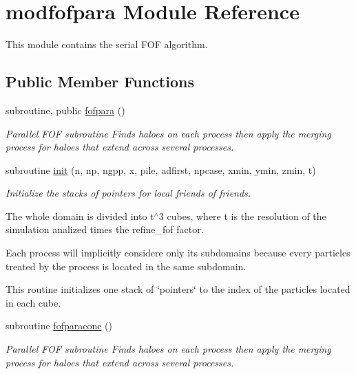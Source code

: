 \hypertarget{classmodfofpara}{\section{modfofpara Module Reference}
\label{classmodfofpara}
}


This module contains the serial F\-O\-F algorithm.  


\subsection*{Public Member Functions}
\begin{DoxyCompactItemize}
\item 
subroutine, public \hyperlink{classmodfofpara_a4ec0353cad472761978bbabf6846ac4f}{fofpara} ()
\begin{DoxyCompactList}\small\item\em Parallel F\-O\-F subroutine Finds haloes on each process then apply the merging process for haloes that extend across several processes. \end{DoxyCompactList}\item 
subroutine \hyperlink{classmodfofpara_a5294ecab752fb3cfbea3bec7cd28a29a}{init} (n, np, ngpp, x, pile, adfirst, npcase, xmin, ymin, zmin, t)
\begin{DoxyCompactList}\small\item\em Initialize the stacks of pointers for local friends of friends.\par
 The whole domain is divided into t$^\wedge$3 cubes, where t is the resolution of the simulation analized times the refine\-\_\-fof factor.\par
 Each process will implicitly considere only its subdomains because every particles treated by the process is located in the same subdomain.\par
 This routine initializes one stack of \char`\"{}pointers\char`\"{} to the index of the particles located in each cube. \end{DoxyCompactList}\item 
subroutine \hyperlink{classmodfofpara_a033a2820dd29f107782b566ca298bde4}{fofparacone} ()
\begin{DoxyCompactList}\small\item\em Parallel F\-O\-F subroutine Finds haloes on each process then apply the merging process for haloes that extend across several processes. \end{DoxyCompactList}\item 

\end{DoxyCompactItemize}
